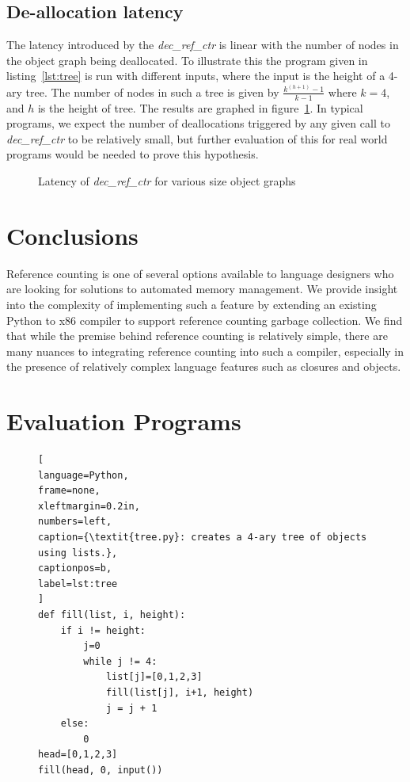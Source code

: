 \documentclass{sigplanconf}
\begin{document}
\subsection{De-allocation latency}

The latency introduced by the \textit{dec\_ref\_ctr} is linear with the number of nodes in the object graph being deallocated.  To illustrate this the program given in listing~\ref{lst:tree} is run with different inputs, where the input is the height of a 4-ary tree.  The number of nodes in such a tree is given by $\frac{{k}^{\left(h+1\right)}-1}{k-1}$ where $k=4$, and $h$ is the height of tree.  The results are graphed in figure~\ref{fig:treelatency}.  In typical programs, we expect the number of deallocations triggered by any given call to \textit{dec\_ref\_ctr} to be relatively small, but further evaluation of this for real world programs would be needed to prove this hypothesis.

\begin{figure}
\normalsize %

\caption{Latency of \textit{dec\_ref\_ctr} for various size object graphs}
\label{fig:treelatency}
\end{figure}

\section{Conclusions}
\label{sec:conclusion}

Reference counting is one of several options available to language designers who are looking for solutions to automated memory management.  We provide insight into the complexity of implementing such a feature by extending an existing Python to x86 compiler to support reference counting garbage collection.  We find that while the premise behind reference counting is relatively simple, there are many nuances to integrating reference counting into such a compiler, especially in the presence of relatively complex language features such as closures and objects.

\appendix
\section{Evaluation Programs}

\begin{figure}[h]
\begin{lstlisting}[
language=Python,
frame=none,
xleftmargin=0.2in,
numbers=left,
caption={\textit{tree.py}: creates a 4-ary tree of objects using lists.},
captionpos=b,
label=lst:tree
]
def fill(list, i, height):
    if i != height:
        j=0
        while j != 4:
            list[j]=[0,1,2,3]
            fill(list[j], i+1, height)
            j = j + 1
    else:
        0
head=[0,1,2,3]
fill(head, 0, input())
\end{lstlisting}
\end{figure}
\end{document}
